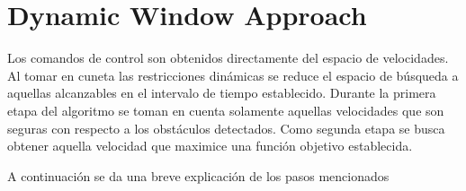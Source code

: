 \documentclass[10pt]{article}
\begin{document}



\section{Dynamic Window Approach}

Los comandos de control son obtenidos directamente del espacio de velocidades. Al tomar en cuneta las restricciones dinámicas se reduce el espacio de búsqueda a aquellas alcanzables en el intervalo de tiempo establecido. Durante la primera etapa del algoritmo se toman en cuenta solamente aquellas velocidades que son seguras con respecto a los obstáculos detectados. Como segunda etapa se busca obtener aquella velocidad que maximice una función objetivo establecida.

A continuación se da una breve explicación de los pasos mencionados


\end{document}
